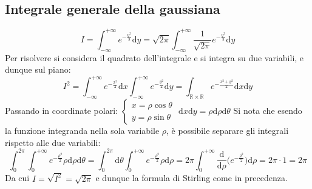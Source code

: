 \documentclass[10pt, oneside]{book}
\theoremstyle{plain}
\begin{document}
\subsection{Integrale generale della gaussiana}
\[I = \int_{-\infty}^{+\infty} e^{-\frac{y^2}{2}} \textrm{d}y = \sqrt{2\pi}\int_{-\infty}^{+\infty} \frac{1}{\sqrt{2\pi}}e^{-\frac{y^2}{2}} \textrm{d}y\]
Per risolvere si considera il quadrato dell'integrale e si integra su due variabili, e dunque sul piano:
\[I^2 = \int_{-\infty}^{+\infty} e^{-\frac{x^2}{2}} \textrm{d}x \int_{-\infty}^{+\infty} e^{-\frac{y^2}{2}} \textrm{d}y = \int_{\mathbb{R}\times \mathbb{R}} e^{-\frac{x^2+ y^2}{2}} \textrm{d}x\textrm{d}y  \]
Passando in coordinate polari: $\displaystyle \begin{cases}
    x = \rho \cos \theta \\ y = \rho \sin \theta
\end{cases}$ $\textrm{d}x \textrm{d}y = \rho \textrm{d}\rho \textrm{d}\theta$
Si nota che esendo la funzione integranda nella sola variabile $\rho$, è possibile separare gli integrali rispetto alle due variabili:
\[\int_{0}^{2\pi}\int_0^{+\infty} e^{-\frac{\rho^2}{2}} \rho \textrm{d}\rho \textrm{d}\theta = \int_{0}^{2\pi} \textrm{d}\theta \int_0^{+\infty}e^{-\frac{\rho^2}{2}} \rho \textrm{d}\rho = 2\pi \int_0^{+\infty}\frac{\textrm{d}}{\textrm{d}\rho}\big(e^{\displaystyle-\frac{\rho^2}{2}}\big)\textrm{d}\rho = 2\pi \cdot 1 = 2\pi\]
Da cui $\displaystyle I = \sqrt{I^2} = \sqrt{2\pi}$ e dunque la formula di Stirling come in precedenza.
\end{document}
